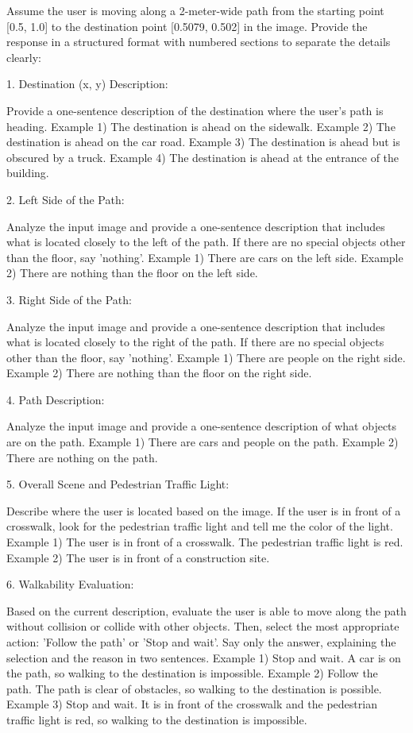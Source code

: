 \begin{tcolorbox}[
colback=cyan!10!white, 
colframe=cyan!50!black, 
rounded corners, 
boxrule=0.5mm, 
title=User prompt of single-turn query,
width=\columnwidth]
Assume the user is moving along a 2-meter-wide path from the starting point [0.5, 1.0] to the destination point [0.5079, 0.502] in the image. Provide the response in a structured format with numbered sections to separate the details clearly: 

1. Destination (x, y) Description: 

Provide a one-sentence description of the destination where the user's path is heading. Example 1) The destination is ahead on the sidewalk. Example 2) The destination is ahead on the car road. Example 3) The destination is ahead but is obscured by a truck. Example 4) The destination is ahead at the entrance of the building. 

2. Left Side of the Path: 

Analyze the input image and provide a one-sentence description that includes what is located closely to the left of the path. If there are no special objects other than the floor, say 'nothing'. Example 1) There are cars on the left side. Example 2) There are nothing than the floor on the left side. 

3. Right Side of the Path: 

Analyze the input image and provide a one-sentence description that includes what is located closely to the right of the path. If there are no special objects other than the floor, say 'nothing'. Example 1) There are people on the right side. Example 2) There are nothing than the floor on the right side. 

4. Path Description: 

Analyze the input image and provide a one-sentence description of what objects are on the path. Example 1) There are cars and people on the path. Example 2) There are nothing on the path. 

5. Overall Scene and Pedestrian Traffic Light: 

Describe where the user is located based on the image. If the user is in front of a crosswalk, look for the pedestrian traffic light and tell me the color of the light. Example 1) The user is in front of a crosswalk. The pedestrian traffic light is red. Example 2) The user is in front of a construction site. 

6. Walkability Evaluation: 

Based on the current description, evaluate the user is able to move along the path without collision or collide with other objects. Then, select the most appropriate action: 'Follow the path' or 'Stop and wait'. Say only the answer, explaining the selection and the reason in two sentences. Example 1) Stop and wait. A car is on the path, so walking to the destination is impossible. Example 2) Follow the path. The path is clear of obstacles, so walking to the destination is possible. Example 3) Stop and wait. It is in front of the crosswalk and the pedestrian traffic light is red, so walking to the destination is impossible. 

\end{tcolorbox}

